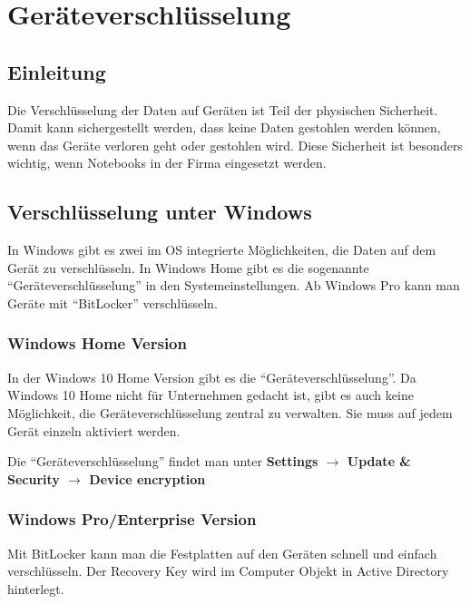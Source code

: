 \chapter{Geräteverschlüsselung}
\section{Einleitung}
Die Verschlüsselung der Daten auf Geräten ist Teil der physischen Sicherheit.
Damit kann sichergestellt werden, dass keine Daten gestohlen werden können, wenn das Geräte verloren geht oder gestohlen wird.
Diese Sicherheit ist besonders wichtig, wenn Notebooks in der Firma eingesetzt werden.

\section{Verschlüsselung unter Windows}
In Windows gibt es zwei im OS integrierte Möglichkeiten, die Daten auf dem Gerät zu verschlüsseln.
In Windows Home gibt es die sogenannte ``Geräteverschlüsselung'' in den Systemeinstellungen.
Ab Windows Pro kann man Geräte mit ``BitLocker'' verschlüsseln.\\

\subsection{Windows Home Version}
In der Windows 10 Home Version gibt es die ``Geräteverschlüsselung''.
Da Windows 10 Home nicht für Unternehmen gedacht ist, gibt es auch keine Möglichkeit, die Geräteverschlüsselung zentral zu verwalten.
Sie muss auf jedem Gerät einzeln aktiviert werden.

Die ``Geräteverschlüsselung'' findet man unter \textbf{Settings $\rightarrow$ Update \& Security $\rightarrow$ Device encryption}

\subsection{Windows Pro/Enterprise Version}
Mit BitLocker kann man die Festplatten auf den Geräten schnell und einfach verschlüsseln.
Der Recovery Key wird im Computer Objekt in Active Directory hinterlegt.


